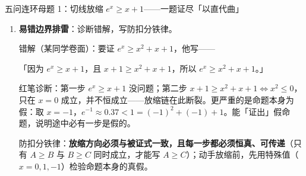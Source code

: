\begin{methodbox}{五问连环母题 1：切线放缩 $e^x\ge x+1$——一题证尽「以直代曲」}
\begin{enumerate}[label=(\arabic*), itemsep=5pt]
\begin{advancedonly}
\textbf{等号条件冲突分析（预告）}：把 $e^x\ge x+1$（取等 $x=0$）与 $-\ln x\ge1-x$（取等 $x=1$）相加，得
\[
e^x-\ln x\ge (x+1)+(1-x)=2 .
\]
但两式的取等点 $0$ 与 $1$ 不可能同时成立，所以末尾的 $\ge$ 必须收紧为 $>$：$e^x-\ln x>2$（完整推导见本章探究四）。反过来，若两条不等式在同一点取等（如 $\ln x\le x-1$ 与 $\ln x\ge1-\dfrac1x$ 都在 $x=1$ 取等），夹逼时才允许写等号。

动机：放缩链的等号是否相容，决定你落笔写 $\ge$ 还是 $>$——这是「多次放缩」与「一次放缩」的本质差别。下一问的错解则是另一种病：引理本身为假。
\end{advancedonly}

\item \textbf{易错边界排雷}：诊断错解，写防扣分铁律。

错解（某同学卷面）：要证 $e^x\ge x^2+x+1$，他写——

「因为 $e^x\ge x+1$，且 $x+1\ge x^2+x+1$，所以 $e^x\ge x^2+x+1$。」

\ifteacher
{\small\textcolor{second}{红笔诊断：第一步 $e^x\ge x+1$ 没问题；第二步 $x+1\ge x^2+x+1\iff x^2\le0$，只在 $x=0$ 成立，并不恒成立——放缩链在此断裂。更严重的是命题本身为假：取 $x=-1$，$e^{-1}\approx0.37<1=(-1)^2+(-1)+1$。能「证出」假命题，说明途中必有一步是假的。}}
\else
\noteblank[5ex]
\fi

防扣分铁律：\textbf{放缩方向必须与被证式一致，且每一步都必须恒真、可传递}（只有 $A\ge B$ 与 $B\ge C$ 同时成立，才能写 $A\ge C$）；动手放缩前，先用特殊值（$x=0,1,-1$）检验命题本身的真假。

\end{enumerate}
\end{methodbox}


